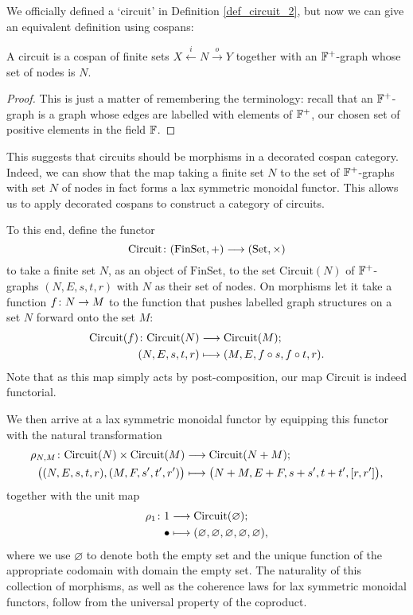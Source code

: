 We officially defined a `circuit' in Definition \ref{def_circuit_2}, but now we can give an equivalent definition using cospans:

\begin{lemma} A circuit is a cospan of finite sets $X \stackrel{i}{\longleftarrow} N
\stackrel{o}{\longrightarrow} Y$ together with an ${\mathbb F}^+$-graph whose set
of nodes is $N$.
\end{lemma}

\begin{proof}
This is just a matter of remembering the terminology: recall that an ${\mathbb F}^+$-graph
is a graph whose edges are labelled with elements of ${\mathbb F}^+$, our chosen set of positive
elements in the field ${\mathbb F}$.
\end{proof}

This suggests that circuits should be morphisms in a decorated  cospan category. Indeed, we can show that the map taking a finite set $N$ to the set of ${\mathbb F}^+$-graphs with
set $N$ of nodes in fact forms a lax symmetric monoidal functor. This allows us to apply
decorated cospans to construct a category of circuits.

To this end, define the functor
\[
  \mathrm{Circuit}{\colon} (\mathrm{FinSet},+) \longrightarrow (\mathrm{Set},\times)
\]
to take a finite set $N$, as an object of $\mathrm{FinSet}$, to the set
$\mathrm{Circuit}(N)$ of ${\mathbb F}^+$-graphs $(N,E,s,t,r)$ with $N$ as their
set of nodes. On
morphisms let it take a function $f{\colon} N \to M$ to the function that pushes
labelled graph structures on a set $N$ forward onto the set $M$:
\begin{align*}
  \mathrm{Circuit}(f){\colon} \mathrm{Circuit}(N) &\longrightarrow
  \mathrm{Circuit}(M); \\
  (N,E,s,t,r) &\longmapsto (M,E,f \circ s, f \circ t, r).
\end{align*}
Note that as this map simply acts by post-composition, our map
$\mathrm{Circuit}$ is indeed functorial.

We then arrive at a lax symmetric monoidal functor by equipping this functor with the
natural transformation 
\begin{align*}
  \rho_{N,M}{\colon} \mathrm{Circuit}(N) \times \mathrm{Circuit}(M)
  &\longrightarrow \mathrm{Circuit}(N+M); \\
  \big( (N,E,s,t,r), (M,F,s',t',r') \big) &\longmapsto
  \big(N+M,E+F,s+s',t+t',[r,r']\big),
\end{align*}
together with the unit map
\begin{align*}
  \rho_1{\colon} 1 &\longrightarrow \mathrm{Circuit}(\varnothing); \\
  \bullet &\longmapsto
  (\varnothing,\varnothing,\varnothing,\varnothing,\varnothing),
\end{align*}
where we use $\varnothing$ to denote both the empty set and the unique function
of the appropriate codomain with domain the empty set. The naturality of this
collection of morphisms, as well as the coherence laws for lax symmetric
monoidal functors, follow from the universal property of the coproduct. 

